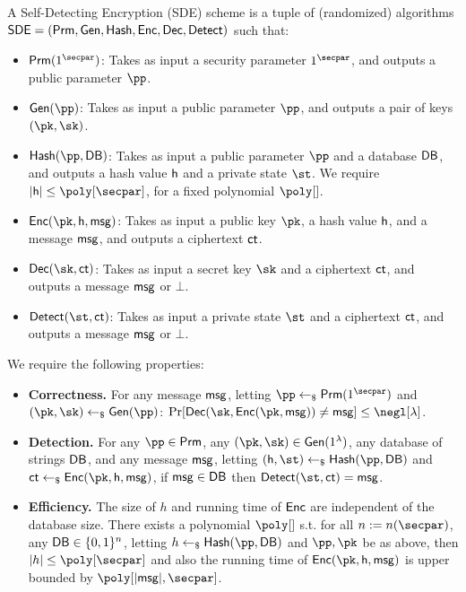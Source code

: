 \begin{definition} A Self-Detecting Encryption (SDE) scheme is a tuple of (randomized) algorithms ${\mathsf{SDE}} = (\mathsf{Prm}, \mathsf{Gen}, \mathsf{Hash}, \mathsf{Enc}, \mathsf{Dec}, {\mathsf{Detect}})$ such that:
	
\begin{itemize}
		\item $\Glo(1^\secpar)$: Takes as input a security parameter $1^\secpar$, and outputs a public parameter $\pp$.
		
		\item $\Gen(\pp)$: Takes as input a public parameter $\pp$, and outputs a pair of keys $(\pk, \sk)$.
		
		\item $\Hash(\pp, \DB)$: Takes as input a public parameter $\pp$ and a database ${\mathsf{DB}}$, and outputs a hash value ${\mathsf{h}}$ and a private state $\st$. We require $|\hsh| \leq \poly[\secpar]$, for a fixed polynomial $\poly[]$. 
		
		\item $\Enc(\pk, \hsh, \msg)$: Takes as input a public key $\pk$, a hash value ${\mathsf{h}}$, and a message $\mathsf{msg}$, and outputs a ciphertext $\mathsf{ct}$.
		
		\item $\Dec(\sk , \ct)$: Takes as input a secret key $\sk$ and a ciphertext $\mathsf{ct}$, and outputs a message $\mathsf{msg}$ or $\bot$.
		
		\item $\Det(\st, \ct)$: Takes as input a private state $\st$ and a ciphertext $\mathsf{ct}$, and outputs a message $\mathsf{msg}$ or $\bot$.
\end{itemize}

We require the following properties:

\begin{itemize}
    \item \textbf{Correctness.} 
    For any message $\mathsf{msg}$, letting $\pp \pick \Glo(1^{\secpar})$ and $(\pk, \sk) \pick \Gen(\pp)$: $\Pr[\Dec(\sk, \Enc(\pk, \msg)) \neq \msg] \leq \negl[\lambda]$.

\item \textbf{Detection.} For any $\pp \in \Glo$, any $(\pk, \sk) \in \Gen(1^{\lambda})$, any database of strings ${\mathsf{DB}}$, and any message $\mathsf{msg}$, letting $(\hsh, \st) \pick \Hash(\pp, \DB)$ and $\ct \pick \Enc(\pk, \hsh, \msg)$, if $\mathsf{msg} \in {\mathsf{DB}}$ then $\Det(\st, \ct) = \msg$.

\item \textbf{Efficiency.} The size of $h$ and running time of $\mathsf{Enc}$ are independent of the database size.  There exists a polynomial $\poly[]$ s.t. for all $n := n(\secpar)$, any ${\mathsf{DB}} \in \{0,1\}^n$, letting $h \pick \Hash(\pp, \DB)$ and $\pp, \pk$ be as above, then $|h| \leq \poly[\secpar]$ and also the running time of $\Enc(\pk, \hsh , \msg)$ is upper bounded by $\poly[|\msg|, \secpar]$. 


\end{itemize}
\end{definition}
